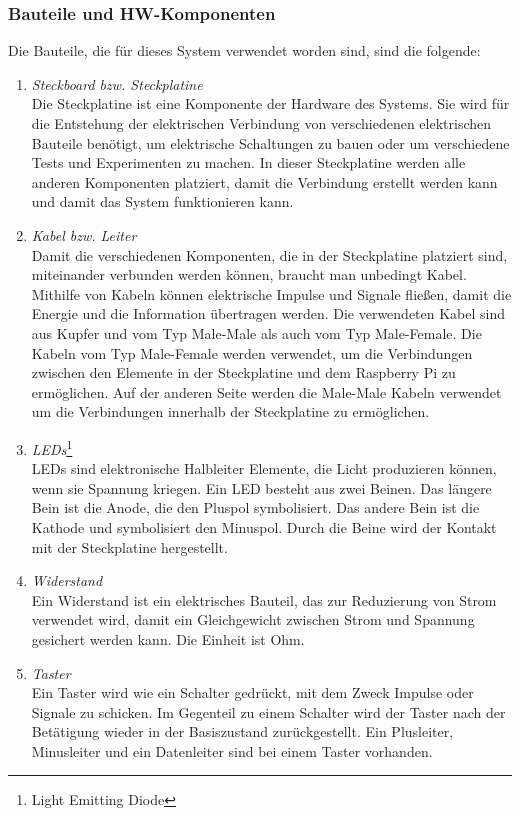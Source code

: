 \subsubsection{Bauteile und HW-Komponenten}
Die Bauteile, die für dieses System verwendet worden sind, sind die folgende:
\begin{enumerate}
	\item \textit{Steckboard bzw. Steckplatine}\\ 
	Die Steckplatine ist eine Komponente der Hardware des Systems. Sie wird für die Entstehung der elektrischen Verbindung von verschiedenen elektrischen Bauteile benötigt, um elektrische Schaltungen zu bauen oder um verschiedene Tests und Experimenten zu machen. In dieser Steckplatine werden alle anderen Komponenten platziert, damit die Verbindung erstellt werden kann und damit das System funktionieren kann.
	\item \textit{Kabel bzw. Leiter} \\
	Damit die verschiedenen Komponenten, die in der Steckplatine platziert sind, miteinander verbunden werden können, braucht man unbedingt Kabel. Mithilfe von Kabeln können elektrische Impulse und Signale fließen, damit die Energie und die Information übertragen werden. Die verwendeten Kabel sind aus Kupfer und vom Typ Male-Male als auch vom Typ Male-Female. Die Kabeln vom Typ Male-Female werden verwendet, um die Verbindungen zwischen den Elemente in der Steckplatine und dem Raspberry Pi zu ermöglichen. Auf der anderen Seite werden die Male-Male Kabeln verwendet um die Verbindungen innerhalb der Steckplatine zu ermöglichen.
	\item \textit{LEDs}\footnote{Light Emitting Diode} \\
	LEDs sind elektronische Halbleiter Elemente, die Licht produzieren können, wenn sie Spannung kriegen. Ein LED besteht aus zwei Beinen. Das längere Bein ist die Anode, die den Pluspol symbolisiert. Das andere Bein ist die Kathode und symbolisiert den Minuspol. Durch die Beine wird der Kontakt mit der Steckplatine hergestellt.\cite{Led}
	\item \textit{Widerstand} \\
	Ein Widerstand ist ein elektrisches Bauteil, das zur Reduzierung von Strom verwendet wird, damit ein Gleichgewicht zwischen Strom und Spannung gesichert werden kann. Die Einheit ist Ohm.\cite{Widerstand}
	\item \textit{Taster} \\
	Ein Taster wird wie ein Schalter gedrückt, mit dem Zweck Impulse oder Signale zu schicken. Im Gegenteil zu einem Schalter wird der Taster nach der Betätigung  wieder in der Basiszustand zurückgestellt. Ein Plusleiter, Minusleiter und ein Datenleiter sind bei einem Taster vorhanden.\cite{Taster}

\end{enumerate}
